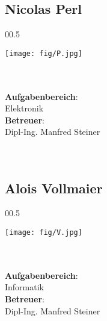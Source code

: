 \subsection*{Nicolas Perl}
\begin{wrapfigure}[10]{0}{0.5\textwidth}
\begin{center}
  \vspace{-20mm}
  \texttt{[image: fig/P.jpg]}
\end{center}
\end{wrapfigure}
\mbox{}\\
\mbox{}\\
\textbf{Aufgabenbereich}:\\
Elektronik\\
\textbf{Betreuer}:\\
Dipl-Ing. Manfred Steiner
\mbox{}\\
\mbox{}\\
\mbox{}\\
\subsection*{Alois Vollmaier}
\begin{wrapfigure}[10]{0}{0.5\textwidth}
\begin{center}
  \vspace{-20mm}
  \texttt{[image: fig/V.jpg]}
\end{center}
\end{wrapfigure}
\mbox{}\\
\mbox{}\\
\textbf{Aufgabenbereich}:\\
Informatik\\
\textbf{Betreuer}:\\
Dipl-Ing. Manfred Steiner
\mbox{}\\
\mbox{}\\
\mbox{}\\
\mbox{}\\
\mbox{}\\
\mbox{}\\